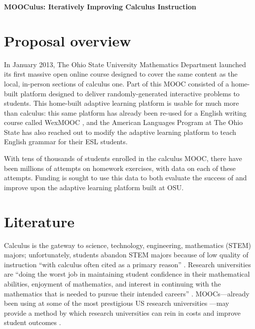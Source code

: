 \documentclass[12pt]{article}
\begin{document}
\begin{center}
  \textbf{MOOCulus: Iteratively Improving Calculus Instruction}
\end{center}

% 

\section{Proposal overview}

In January 2013, The Ohio State University Mathematics Department
launched its first massive open online course designed to cover the
same content as the local, in-person sections of calculus one.  Part
of this MOOC consisted of a home-built platform designed to deliver
randomly-generated interactive problems to students.  This home-built
adaptive learning platform is usable for much more than calculus: this
same platform has already been re-used for a English writing course
called WexMOOC \parencite{gates-foundation-grant}, and the American
Languages Program at The Ohio State has also reached out to modify the
adaptive learning platform to teach English grammar for their ESL
students.

With tens of thousands of students enrolled in the calculus MOOC,
there have been millions of attempts on homework exercises, with data
on each of these attempts.  Funding is sought to use this data to both
evaluate the success of and improve upon the adaptive learning
platform built at OSU.

\section{Literature}

Calculus is the gateway to science, technology, engineering,
mathematics (STEM) majors; unfortunately, students abandon STEM majors
because of low quality of instruction ``with calculus often cited as a
primary reason'' \parencite{calculus-programs}.  Research universities
are ``doing the worst job in maintaining student confidence in their
mathematical abilities, enjoyment of mathematics, and interest in
continuing with the mathematics that is needed to pursue their
intended careers'' \parencite{calculus-students}.  MOOCs---already
been using at some of the most prestigious US research
universities \parencite{morris2013moocs}---may provide a method by
which research universities can rein in costs and improve student
outcomes \parencite{bowen2013higher}.
\end{document}

